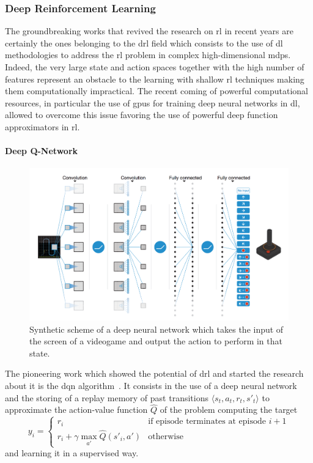 \subsubsection{Deep Reinforcement Learning}
The groundbreaking works that revived the research on \gls{rl} in recent years are certainly the ones belonging to the \gls{drl} field which consists to the use of \gls{dl} methodologies to address the \gls{rl} problem in complex high-dimensional \glspl{mdp}. Indeed, the very large state and action spaces together with the high number of features represent an obstacle to the learning with shallow \gls{rl} techniques making them computationally impractical. The recent coming of powerful computational resources, in particular the use of \glspl{gpu} for training deep neural networks in \gls{dl}, allowed to overcome this issue favoring the use of powerful deep function approximators in \gls{rl}.

\paragraph{Deep Q-Network}\label{S:dqn}
\begin{figure}[t]
\begin{minipage}{\textwidth}
\begin{center}
  \includegraphics[scale=.15]{img/dqn.png}
\end{center}
\end{minipage}
\caption[DQN network scheme]{Synthetic scheme of a deep neural network which takes the input of the screen of a videogame and output the action to perform in that state.}
\end{figure}
The pioneering work which showed the potential of \gls{drl} and started the research about it is the \gls{dqn} algorithm~\cite{mnih2015human}. It consists in the use of a deep neural network and the storing of a replay memory of past transitions $\langle s_t, a_t, r_t, s'_t \rangle$ to approximate the action-value function $\hat{Q}$ of the problem computing the target
\begin{equation}\label{E:dqn_update}
y_i=
    \begin{cases}
    r_i & \text{if episode terminates at episode }i+1\\
    r_i + \gamma \max_{a'} \hat{Q}(s'_i, a') & \text{otherwise}
    \end{cases}
\end{equation}
and learning it in a supervised way.

